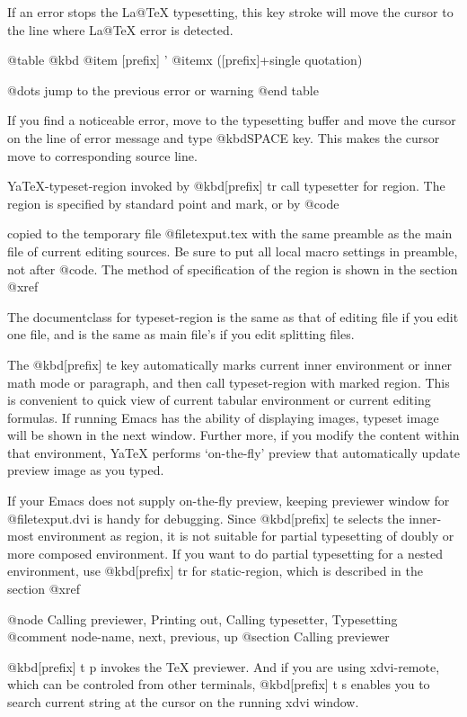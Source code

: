   If an error  stops the La@TeX{}  typesetting, this  key stroke will
move the cursor to the line where La@TeX{} error is detected.

@table @kbd
@item [prefix] '
@itemx ([prefix]+single quotation)

        @dots{} jump to the previous error or warning
@end table

  If you find a noticeable error, move to the typesetting buffer and move
the cursor on the line of error message and type @kbd{SPACE} key.  This
makes the cursor move to corresponding source line.

  YaTeX-typeset-region invoked by @kbd{[prefix] tr} call typesetter
for region.  The region is specified by standard point and mark, or
by @code{%
copied to the temporary file @file{texput.tex} with the same preamble
as the main file of current editing sources.  Be sure to put
all local macro settings in preamble, not after @code{}.
  The method of specification of the region is shown in the
section @xref{%

  The documentclass  for typeset-region is the same as that of editing
file if you edit one  file,  and is the same as main file's if you
edit splitting files.

  The @kbd{[prefix] te} key automatically marks current inner environment
or inner math mode or paragraph, and then call typeset-region with marked
region.  This
is convenient to quick view of current tabular environment or current
editing formulas.  If running Emacs has the ability of displaying images,
typeset image will be shown in the next window.  Further more,
if you modify the content within that environment, YaTeX performs
`on-the-fly' preview that automatically update preview image as you typed.

If your Emacs does not supply on-the-fly preview,
keeping previewer window for @file{texput.dvi} is handy
for debugging.  Since @kbd{[prefix] te} selects the inner-most environment
as region, it is not suitable for partial typesetting of doubly or more
composed environment.  If you want to do partial typesetting for a nested
environment, use @kbd{[prefix] tr} for static-region, which is described
in the section @xref{%

@node Calling previewer, Printing out, Calling typesetter, Typesetting
@comment  node-name,  next,  previous,  up
@section Calling previewer

  @kbd{[prefix] t p} invokes the TeX previewer.  And if you are using
xdvi-remote, which can be controled from other terminals, @kbd{[prefix] t
s} enables you to search current string at the cursor on the running xdvi
window.

}}}
